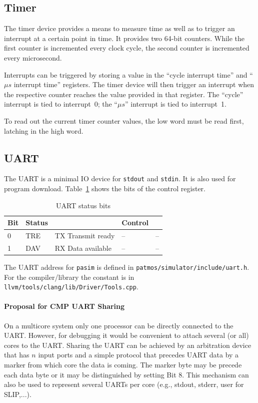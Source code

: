 \documentclass[a4paper,fontsize=10pt,twoside,DIV15,BCOR12mm,headinclude=true,footinclude=false,pagesize,bibtotoc]{scrbook}
\newcommand{\code}[1]{{\texttt{#1}}}
\newcommand{\comment}[3]{

\textsf{\textbf{#1}} {\color{#3}#2}}
\newcommand{\martin}[1]{\comment{Martin}{#1}{Blue}}
\renewcommand{\martin}[1]{}
\begin{document}
\subsection{Timer}

The timer device provides a means to measure time as well as to
trigger an interrupt at a certain point in time. It provides two
64-bit counters. While the first counter is incremented every clock
cycle, the second counter is incremented every microsecond.

Interrupts can be triggered by storing a value in the ``cycle
interrupt time'' and ``$\mu s$ interrupt time'' registers. The timer
device will then trigger an interrupt when the respective counter
reaches the value provided in that register. The ``cycle'' interrupt
is tied to interrupt~0; the ``$\mu s$'' interrupt is tied to
interrupt~1.

To read out the current timer counter values, the low word must be read first, latching in the high word.

\subsection{UART}

The UART is a minimal IO device for \texttt{stdout} and \texttt{stdin}.
It is also used for program download. Table~\ref{tab:uart} shows the
bits of the control register.

\begin{table}
\centering
\begin{tabular}{lllll}
\toprule
Bit & Status & & Control & \\
\midrule
0 & TRE & TX Transmit ready & -- & -- \\
1 & DAV & RX Data available & -- & -- \\
\bottomrule
\end{tabular}
\caption{UART status bits} %
\label{tab:uart}
\end{table}

The UART address for \code{pasim} is defined in \code{patmos/simulator/include/uart.h}.
For the compiler/library the constant is in \code{llvm/tools/clang/lib/Driver/Tools.cpp}.

\paragraph{Proposal for CMP UART Sharing}
On a multicore system only one processor can be directly connected to the
UART. However, for debugging it would be convenient to attach several (or all)
cores to the UART. Sharing the UART can be achieved by an arbitration device
that has $n$ input ports and a simple protocol that precedes UART data by a
marker from which core the data is coming. The marker byte may be precede
each data byte or it may be distinguished by setting Bit 8. This mechanism can
also be used to represent several UARTs per core (e.g., stdout, stderr, user for SLIP,...).
\martin{The protocol shall be done in HW -- let's find a student for this.}
\end{document}
